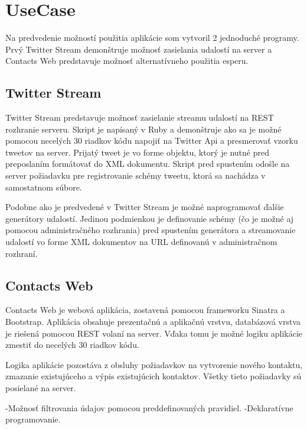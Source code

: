 \section{UseCase}
	Na predvedenie možností použitia aplikácie som vytvoril 2 jednoduché programy. Prvý Twitter Stream demonštruje možnosť zasielania udalostí na server a Contacts Web predstavuje možnosť alternatívneho použitia esperu. 
	
	\subsection{Twitter Stream}
	Twitter Stream predstavuje možnosť zasielanie streamu udalostí na REST rozhranie serveru. Skript je napísaný v Ruby a demonštruje ako sa je možné pomocou necelých 30 riadkov kódu napojiť na Twitter Api a presmerovať vzorku tweetov na server. Prijatý tweet je vo forme objektu, ktorý je nutné pred preposlaním formátovať do XML dokumentu. Skript pred spustením odošle na server požiadavku pre registrovanie schémy tweetu, ktorá sa nachádza v samostatnom súbore.
	
	Podobne ako je predvedené v Twitter Stream je možné naprogramovať ďalšie generátory udalostí. Jedinou podmienkou je definovanie schémy (čo je možné aj pomocou administračného rozhrania) pred spustením generátora a streamovanie udalostí vo forme XML dokumentov na URL definovanú v administračnom rozhraní.
	
	\subsection{Contacts Web}
	Contacts Web je webová aplikácia, zostavená pomocou frameworku Sinatra a Bootstrap. Aplikácia obsahuje prezentačnú a aplikačnú vrstvu, databázová vrstva je riešená pomocou REST volaní na server. Vďaka tomu je možné logiku aplikácie zmestiť do necelých 30 riadkov kódu.
	
	Logika aplikácie pozostáva z obsluhy požiadavkov na vytvorenie nového kontaktu, zmazanie existujúceho a výpis existujúcich kontaktov. Všetky tieto požiadavky sú posielané na server.
	
	-Možnosť filtrovania údajov pomocou preddefinovaných pravidiel.
	-Deklaratívne programovanie.
	